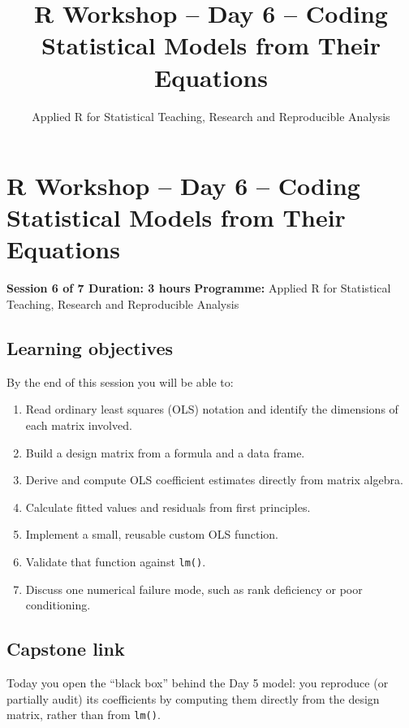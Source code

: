 \documentclass[11pt]{article}
\title{R Workshop -- Day 6 -- Coding Statistical Models from Their Equations}
\author{Applied R for Statistical Teaching, Research and Reproducible Analysis}
\date{}
\providecommand{\tightlist}{%
  \setlength{\itemsep}{0pt}\setlength{\parskip}{0pt}}
\begin{document}
\maketitle
\tableofcontents
\newpage
\hypertarget{r-workshop-day-6-coding-statistical-models-from-their-equations}{%
\section{R Workshop -- Day 6 -- Coding Statistical Models from Their
Equations}\label{r-workshop-day-6-coding-statistical-models-from-their-equations}}

\textbf{Session 6 of 7 \textbar{} Duration: 3 hours} \textbf{Programme:}
Applied R for Statistical Teaching, Research and Reproducible Analysis

\hypertarget{learning-objectives}{%
\subsection{Learning objectives}\label{learning-objectives}}

By the end of this session you will be able to:

\begin{enumerate}
\def\labelenumi{\arabic{enumi}.}
\tightlist
\item
  Read ordinary least squares (OLS) notation and identify the dimensions
  of each matrix involved.
\item
  Build a design matrix from a formula and a data frame.
\item
  Derive and compute OLS coefficient estimates directly from matrix
  algebra.
\item
  Calculate fitted values and residuals from first principles.
\item
  Implement a small, reusable custom OLS function.
\item
  Validate that function against \texttt{lm()}.
\item
  Discuss one numerical failure mode, such as rank deficiency or poor
  conditioning.
\end{enumerate}

\hypertarget{capstone-link}{%
\subsection{Capstone link}\label{capstone-link}}

Today you open the ``black box'' behind the Day 5 model: you reproduce
(or partially audit) its coefficients by computing them directly from
the design matrix, rather than from \texttt{lm()}.
\end{document}
